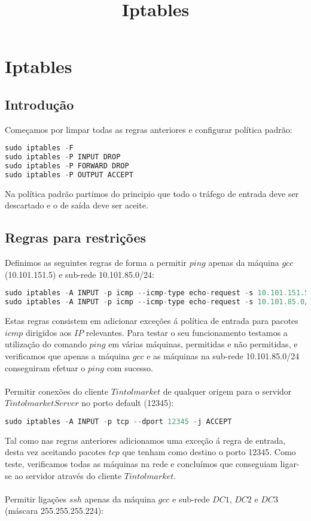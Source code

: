\documentclass[10pt,a4paper]{report}
\title{\LARGE{Iptables}}
\date{}
\begin{document}
\chapter{Iptables}
\section*{Introdução}
Começamos por limpar todas as regras anteriores e configurar política padrão:
\begin{lstlisting}[language=Python]
sudo iptables -F
sudo iptables -P INPUT DROP
sudo iptables -P FORWARD DROP
sudo iptables -P OUTPUT ACCEPT
\end{lstlisting}
Na política padrão partimos do principio que todo o tráfego de entrada deve ser descartado e o de saída deve ser aceite.

\section*{Regras para restrições}
Definimos as seguintes regras de forma a permitir $ping$ apenas da máquina $gcc$ (10.101.151.5) e sub-rede 10.101.85.0/24:
\begin{lstlisting}[language=Java]
sudo iptables -A INPUT -p icmp --icmp-type echo-request -s 10.101.151.5 -j ACCEPT
sudo iptables -A INPUT -p icmp --icmp-type echo-request -s 10.101.85.0/24 -j ACCEPT
\end{lstlisting}
Estas regras consistem em adicionar exceções á política de entrada para pacotes $icmp$ dirigidos aos $IP$ relevantes. Para testar o seu funcionamento testamos a utilização do comando $ping$ em várias máquinas, permitidas e não permitidas, e verificamos que apenas a máquina $gcc$ e as máquinas na sub-rede 10.101.85.0/24 conseguiram efetuar o $ping$ com sucesso.\\
\\
Permitir conexões do cliente $Tintolmarket$ de qualquer origem para o servidor $TintolmarketServer$ no porto default (12345):
\begin{lstlisting}[language=Java]
sudo iptables -A INPUT -p tcp --dport 12345 -j ACCEPT
\end{lstlisting}
Tal como nas regras anteriores adicionamos uma exceção á regra de entrada, desta vez aceitando pacotes $tcp$ que tenham como destino o porto 12345. Como teste, verificamos todas as máquinas na rede e concluímos que conseguiam ligar-se ao servidor através do cliente $Tintolmarket$.\\
\\
Permitir ligações $ssh$ apenas da máquina $gcc$ e sub-rede $DC1$, $DC2$ e $DC3$ (máscara 255.255.255.224):
\end{document}
